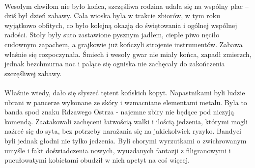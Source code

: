 \documentclass[10pt,twoside,twocolumn]{book}
\begin{document}
\paragraph{}
Wesołym chwilom nie było końca, szczęśliwa rodzina udała się na wspólny plac – dziś był dzień zabawy.
Cała wioska była w trakcie zbiorów, w tym roku wyjątkowo obfitych, co było kolejną okazją do świętowania i ogólnej wspólnej radości.
Stoły były suto zastawione pysznym jadłem, ciepłe piwo nęciło cudownym zapachem, a grajkowie już kończyli strojenie instrumentów.
Zabawa właśnie się rozpoczynała.
Śmiech i wesoły gwar nie miały końca, zapadł zmierzch, jednak bezchmurna noc i palące się ogniska nie zachęcały do zakończenia szczęśliwej zabawy.

\paragraph{}
Właśnie wtedy, dało się słyszeć tętent końskich kopyt.
Napastnikami byli ludzie ubrani w pancerze wykonane ze skóry i wzmacniane elementami metalu.
Była to banda spod znaku Rdzawego Ostrza - najemne zbiry nie będące pod niczyją komendą.
Zaatakowali zachęceni łatwością walki i ilością jedzenia, którymi mogli nażreć się do syta, bez potrzeby narażania się na jakiekolwiek ryzyko.
Bandyci byli jednak głodni nie tylko jedzenia.
Byli chorymi wyrzutkami o zwichrowanym umyśle i fakt doświadczenia nowych, wyuzdanych fantazji z filigranowymi i pucułowatymi kobietami obudził w nich apetyt na coś więcej.
\end{document}
